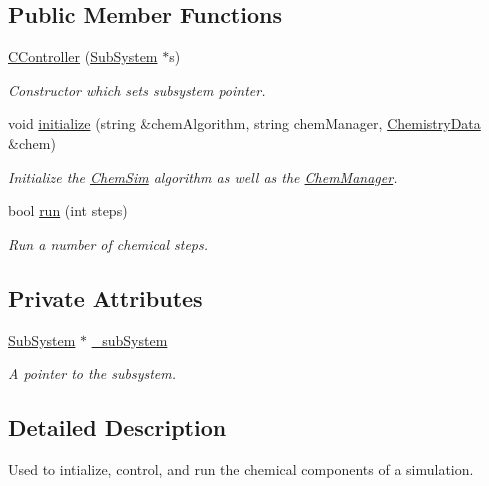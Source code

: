 \subsection*{Public Member Functions}
\begin{DoxyCompactItemize}
\item 
\hyperlink{classCController_a8d10d61d353a0fc1ee9a531b4ec570db}{C\+Controller} (\hyperlink{classSubSystem}{Sub\+System} $\ast$s)
\begin{DoxyCompactList}\small\item\em Constructor which sets subsystem pointer. \end{DoxyCompactList}\item 
void \hyperlink{classCController_a6f1523b66f627d2cecf6e32ad88aca58}{initialize} (string \&chem\+Algorithm, string chem\+Manager, \hyperlink{structChemistryData}{Chemistry\+Data} \&chem)
\begin{DoxyCompactList}\small\item\em Initialize the \hyperlink{classChemSim}{Chem\+Sim} algorithm as well as the \hyperlink{classChemManager}{Chem\+Manager}. \end{DoxyCompactList}\item 
bool \hyperlink{classCController_a45dad60ad7d810684d45385c45e5c876}{run} (int steps)
\begin{DoxyCompactList}\small\item\em Run a number of chemical steps. \end{DoxyCompactList}\end{DoxyCompactItemize}
\subsection*{Private Attributes}
\begin{DoxyCompactItemize}
\item 
\hyperlink{classSubSystem}{Sub\+System} $\ast$ \hyperlink{classCController_a334a900bd08abab80bda555a155d234a}{\+\_\+sub\+System}
\begin{DoxyCompactList}\small\item\em A pointer to the subsystem. \end{DoxyCompactList}\end{DoxyCompactItemize}


\subsection{Detailed Description}
Used to intialize, control, and run the chemical components of a simulation. 

